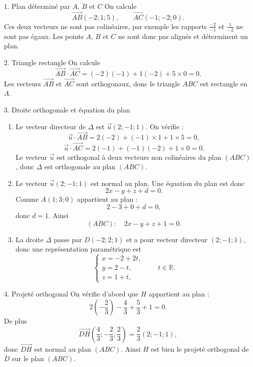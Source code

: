 \documentclass[11pt,a4paper]{article}
\newcommand{\vect}[1]{\overrightarrow{#1}}
\begin{document}
\begin{correctionbox}{1. Plan déterminé par $A$, $B$ et $C$}
On calcule
\[
\vect{AB}(-2;1;5),\qquad \vect{AC}(-1;-2;0).
\]
Ces deux vecteurs ne sont pas colinéaires, par exemple les rapports $\frac{-2}{-1}$ et $\frac{1}{-2}$ ne sont pas égaux. Les points $A$, $B$ et $C$ ne sont donc pas alignés et déterminent un plan.
\end{correctionbox}

\begin{correctionbox}{2. Triangle rectangle}
On calcule
\[
\vect{AB}\cdot\vect{AC}=(-2)(-1)+1(-2)+5\times0=0.
\]
Les vecteurs $\vect{AB}$ et $\vect{AC}$ sont orthogonaux, donc le triangle $ABC$ est rectangle en $A$.
\end{correctionbox}

\begin{correctionbox}{3. Droite orthogonale et équation du plan}
\begin{enumerate}
\item Le vecteur directeur de $\Delta$ est $\vec u(2;-1;1)$. On vérifie :
\[
\vec u\cdot\vect{AB}=2(-2)+(-1)\times1+1\times5=0,
\]
\[
\vec u\cdot\vect{AC}=2(-1)+(-1)(-2)+1\times0=0.
\]
Le vecteur $\vec u$ est orthogonal à deux vecteurs non colinéaires du plan $(ABC)$, donc $\Delta$ est orthogonale au plan $(ABC)$.

\item Le vecteur $\vec u(2;-1;1)$ est normal au plan. Une équation du plan est donc
\[
2x-y+z+d=0.
\]
Comme $A(1;3;0)$ appartient au plan :
\[
2-3+0+d=0,
\]
donc $d=1$. Ainsi
\[
(ABC):\quad 2x-y+z+1=0.
\]

\item La droite $\Delta$ passe par $D(-2;2;1)$ et a pour vecteur directeur $(2;-1;1)$, donc une représentation paramétrique est
\[
\begin{cases}
x=-2+2t,\\
y=2-t,\\
z=1+t,
\end{cases}\qquad t\in\mathbb R.
\]
\end{enumerate}
\end{correctionbox}

\begin{correctionbox}{4. Projeté orthogonal}
On vérifie d'abord que $H$ appartient au plan :
\[
2\left(-\dfrac23\right)-\dfrac43+\dfrac53+1=0.
\]
De plus
\[
\vect{DH}\left(\dfrac43;-\dfrac23;\dfrac23\right)=\dfrac23(2;-1;1),
\]
donc $\vect{DH}$ est normal au plan $(ABC)$. Ainsi $H$ est bien le projeté orthogonal de $D$ sur le plan $(ABC)$.
\end{correctionbox}
\end{document}
